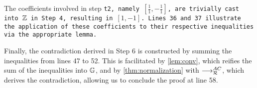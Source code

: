 The coefficients involved in step \tt{t2}, namely $[\frac{1}{1}, -\frac{1}{1}]$, are trivially cast into $\mathbb{Z}$ in Step 4,
resulting in $[1, -1]$. Lines 36 and 37 illustrate the application of these coefficients to their respective inequalities via the appropriate lemma.

Finally, the contradiction derived in Step 6 is constructed by summing the inequalities from lines 47 to 52.
This is facilitated by \cref{lem:conv}, which reifies the sum of the inequalities into $\mathbb{G}$, and by \cref{thm:normalization} with $\longrightarrow_{\mathcal{R}}^{AC}$,
which derives the contradiction, allowing us to conclude the proof at line 58.

